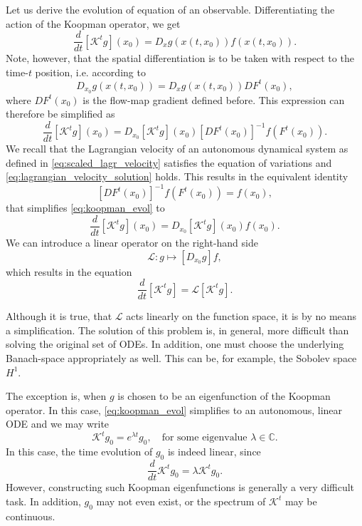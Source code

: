 Let us derive the evolution of equation of an observable. Differentiating the action of the Koopman operator, we get
\begin{equation}
\frac{d}{dt}\left[\mathcal{K}^t g\right](x_0) = D_x g(x(t,x_0)) f(x(t,x_0)).
\end{equation}
Note, however, that the spatial differentiation is to be taken with respect to the time-$t$ position, i.e. according to
\begin{equation}
\label{eq:koopman_pullback}
D_{x_0}g(x(t,x_0)) = D_x g(x(t,x_0))DF^t(x_0),
\end{equation}
where $DF^t(x_0)$ is the flow-map gradient defined before. This expression can therefore be simplified as
\begin{equation}
\label{eq:koopman_evol}
\frac{d}{dt}\left[\mathcal{K}^t g\right](x_0) = D_{x_0} \left[\mathcal{K}^t g\right](x_0)\left[DF^t(x_0)\right]^{-1}f(F^t(x_0)).
\end{equation}
We recall that the Lagrangian velocity of an autonomous dynamical system as defined in \eqref{eq:scaled_lagr_velocity} satisfies the equation of variations and \eqref{eq:lagrangian_velocity_solution} holds. This results in the equivalent identity 
\begin{equation}
\left[DF^{t}(x_0)\right]^{-1}f(F^t(x_0)) =  f(x_0),
\end{equation}
that simplifies \eqref{eq:koopman_evol} to 
\begin{equation}
\label{eq:koopman_evol2}
\frac{d}{dt}\left[\mathcal{K}^t g\right](x_0) = D_{x_0} \left[\mathcal{K}^t g\right](x_0)f(x_0).
\end{equation}
We can introduce a linear operator on the right-hand side 
\begin{equation}
\label{eq:koopman_Ldef}
 \mathcal{L} : g \mapsto [D_{x_0}g]f,
 \end{equation}
 which results in the equation
 \begin{equation}
\label{eq:koopman_Ldef}
\frac{d}{dt} \left[\mathcal{K}^t g\right] =\mathcal{L}  \left[\mathcal{K}^t g\right].
 \end{equation}
 
 Although it is true, that $\mathcal{L}$ acts linearly on the function space, it is by no means a simplification. The solution of this problem is, in general, more difficult than solving the original set of ODEs. In addition, one must choose the underlying Banach-space appropriately as well. This can be, for example, the Sobolev space $H^1$.
 
The exception is, when $g$ is chosen to be an eigenfunction of the Koopman operator. In this case, \eqref{eq:koopman_evol} simplifies to an autonomous, linear ODE and we may write
\begin{equation}
\mathcal{K}^t g_0 = e^{\lambda t}g_0, \quad \text{for some eigenvalue } \lambda\in \mathbb{C}.
\end{equation}
In this case, the time evolution of $g_0$ is indeed linear, since
\begin{equation}
\frac{d}{dt}\mathcal{K}^t g_0 = \lambda \mathcal{K}^t g_0.
\end{equation}
However, constructing such Koopman eigenfunctions is generally a very difficult task. In addition, $g_0$ may not even exist, or the spectrum of $\mathcal{K}^t$ may be continuous. 
